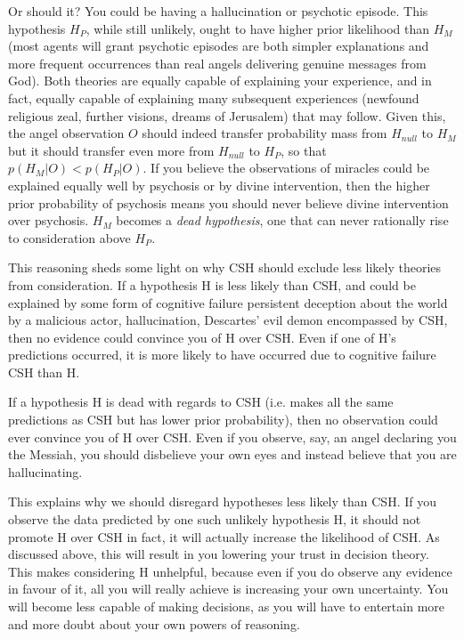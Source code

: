 \documentclass{article}
\begin{document}
Or should it? You could be having a hallucination or psychotic episode. This hypothesis \(H_{P}\), while still unlikely, ought to have higher prior likelihood than \(H_{M}\) (most agents will grant psychotic episodes are both simpler explanations and more frequent occurrences than real angels delivering genuine messages from God). Both theories are equally capable of explaining your experience, and in fact, equally capable of explaining many subsequent experiences (newfound religious zeal, further visions, dreams of Jerusalem) that may follow. Given this, the angel observation \(O\) should indeed transfer probability mass from \(H_{null}\) to \(H_{M}\) \textemdash{} but it should transfer even more from \(H_{null}\) to \(H_{P}\), so that \(p(H_{M}|O)<p(H_{P}|O)\). If you believe the observations of miracles could be explained equally well by psychosis or by divine intervention, then the higher prior probability of psychosis means you should never believe divine intervention over psychosis. \(H_{M}\) becomes a \textit{dead hypothesis}, one that can never rationally rise to consideration above \(H_{P}\).

This reasoning sheds some light on why CSH should exclude less likely theories from consideration. If a hypothesis H is less likely than CSH, and could be explained by some form of cognitive failure \textemdash{} persistent deception about the world by a malicious actor, hallucination, Descartes' evil demon \textemdash{} encompassed by CSH, then no evidence could convince you of H over CSH. Even if one of H's predictions occurred, it is more likely to have occurred due to cognitive failure CSH than H. 

If a hypothesis H is dead with regards to CSH (i.e. makes all the same predictions as CSH but has lower prior probability), then no observation could ever convince you of H over CSH. Even if you observe, say, an angel declaring you the Messiah, you should disbelieve your own eyes and instead believe that you are hallucinating.

This explains why we should disregard hypotheses less likely than CSH. If you observe the data predicted by one such unlikely hypothesis H, it should not promote H over CSH \textemdash{} in fact, it will actually increase the likelihood of CSH. As discussed above, this will result in you lowering your trust in decision theory. This makes considering H unhelpful, because even if you do observe any evidence in favour of it, all you will really achieve is increasing your own uncertainty. You will become less capable of making decisions, as you will have to entertain more and more doubt about your own powers of reasoning.
\end{document}
